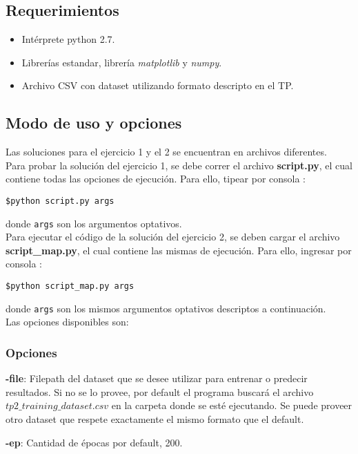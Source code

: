 \subsection{Requerimientos}
\begin{itemize}
\item Intérprete python 2.7.
\item Librerías estandar, librería \textit{matplotlib} y \textit{numpy}.
\item Archivo CSV con dataset utilizando formato descripto en el TP. 
\end{itemize}

\subsection{Modo de uso y opciones}

Las soluciones para el ejercicio 1 y el 2 se encuentran en archivos diferentes.\\

Para probar la solución del ejercicio 1, se debe correr el archivo \textbf{script.py}, el cual contiene todas las opciones de ejecución. Para ello, tipear por consola :

\texttt{\$python script.py args}

donde \texttt{args} son los argumentos optativos.\\

Para ejecutar el código de la solución del ejercicio 2, se deben cargar el archivo \textbf{script\_map.py}, el cual contiene las mismas de ejecución. Para ello, ingresar por consola :

\texttt{\$python script\_map.py args}

donde \texttt{args} son los mismos argumentos optativos descriptos a continuación.\\

Las opciones disponibles son:

\subsubsection{Opciones}

\textbf{-file}: Filepath del dataset que se desee utilizar para entrenar o predecir resultados. Si no se lo provee, por default el programa buscará el archivo $tp2\_training\_dataset.csv$ en la carpeta donde se esté ejecutando. Se puede proveer otro dataset que respete exactamente el mismo formato que el default.

\textbf{-ep}: Cantidad de épocas por default, 200.

